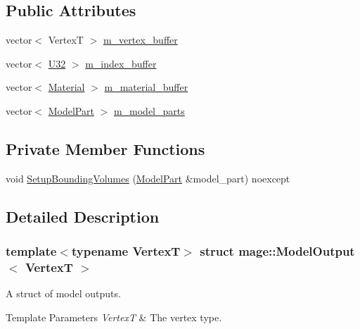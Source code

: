 \subsection*{Public Attributes}
\begin{DoxyCompactItemize}
\item 
vector$<$ VertexT $>$ \hyperlink{structmage_1_1_model_output_a4d669b5fee2d6a1bc993a94b0a2d5580}{m\+\_\+vertex\+\_\+buffer}
\item 
vector$<$ \hyperlink{namespacemage_a41c104c036fba3756a74e19f793eeaa1}{U32} $>$ \hyperlink{structmage_1_1_model_output_a0d38026bd5211748810a27b54375689d}{m\+\_\+index\+\_\+buffer}
\item 
vector$<$ \hyperlink{structmage_1_1_material}{Material} $>$ \hyperlink{structmage_1_1_model_output_a3bfdb493d92a83b40a8b363a96e89a0c}{m\+\_\+material\+\_\+buffer}
\item 
vector$<$ \hyperlink{structmage_1_1_model_part}{Model\+Part} $>$ \hyperlink{structmage_1_1_model_output_a86df369ff4959458ee6991c36e6aa01a}{m\+\_\+model\+\_\+parts}
\end{DoxyCompactItemize}
\subsection*{Private Member Functions}
\begin{DoxyCompactItemize}
\item 
void \hyperlink{structmage_1_1_model_output_aec05a0a43d141b8b8260e741314615c1}{Setup\+Bounding\+Volumes} (\hyperlink{structmage_1_1_model_part}{Model\+Part} \&model\+\_\+part) noexcept
\end{DoxyCompactItemize}


\subsection{Detailed Description}
\subsubsection*{template$<$typename VertexT$>$\newline
struct mage\+::\+Model\+Output$<$ Vertex\+T $>$}

A struct of model outputs.


\begin{DoxyTemplParams}{Template Parameters}
{\em VertexT} & The vertex type. \\
\hline
\end{DoxyTemplParams}


